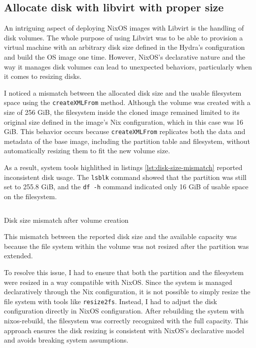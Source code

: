 \subsection{Allocate disk with libvirt with proper size}

An intriguing aspect of deploying NixOS images with Libvirt is the handling of disk volumes. The whole purpose of using Libvirt was to be able to provision a virtual machine with an arbitrary disk size defined in the Hydra's configuration and build the OS image one time. However, NixOS's declarative nature and the way it manages disk volumes can lead to unexpected behaviors, particularly when it comes to resizing disks.

I noticed a mismatch between the allocated disk size and the usable filesystem space using the \texttt{createXMLFrom} method. Although the volume was created with a size of 256 GiB, the filesystem inside the cloned image remained limited to its original size defined in the image's Nix configuration, which in this case was 16 GiB. This behavior occurs because \texttt{createXMLFrom} replicates both the data and metadata of the base image, including the partition table and filesystem, without automatically resizing them to fit the new volume size.

As a result, system tools highlithed in listings \ref{lst:disk-size-mismatch} reported inconsistent disk usage. The \texttt{lsblk} command showed that the partition was still set to 255.8 GiB, and the \texttt{df -h} command indicated only 16 GiB of usable space on the filesystem.

\begin{listing}[!ht]
    \inputminted{shell-session}{assets/listings/libvirt-disk.txt}
    \caption{Disk size mismatch after volume creation}
    \label{lst:disk-size-mismatch}
\end{listing}


This mismatch between the reported disk size and the available capacity was because the file system within the volume was not resized after the partition was extended.

To resolve this issue, I had to ensure that both the partition and the filesystem were resized in a way compatible with NixOS. Since the system is managed declaratively through the Nix configuration, it is not possible to simply resize the file system with tools like \texttt{resize2fs}. Instead, I had to adjust the disk configuration directly in NixOS configuration. After rebuilding the system with nixos-rebuild, the filesystem was correctly recognized with the full capacity. This approach ensures the disk resizing is consistent with NixOS's declarative model and avoids breaking system assumptions.